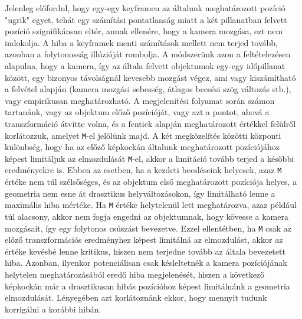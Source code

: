 Jelenleg előfordul, hogy egy-egy keyframen az általunk meghatározott pozíció "ugrik" egyet, tehát egy számítási pontatlanság miatt a két pillanatban felvett pozíció szignifikánsan eltér, annak ellenére, hogy a kamera mozgása, ezt nem indokolja.
A hiba a keyframek menti számítások mellett nem terjed tovább, azonban a folytonosság illúzióját rombolja.
A módszerünk azon a feltételezésen alapulna, hogy a kamera, így az általa felvett objektumok egy-egy időpillanat között, egy bizonyos távolságnál kevesebb mozgást végez, ami vagy kiszámítható a felvétel alapján (kamera mozgási sebesség, átlagos beesési szög változás stb.), vagy empirikusan meghatározható.
A megjelenítési folyamat során számon tartanánk, vagy az objektum előző pozícióját, vagy azt a pontot, ahová a transzformáció átvitte volna, és a fentiek alapján meghatározott értékkel felülről korlátozzuk, amelyet \texttt{M}-el jelölünk majd. 
A két megközelítés közötti központi különbség, hogy ha az előző képkockán általunk meghatározott pozíciójához képest limitáljuk az elmozdulását \texttt{M}-el, akkor a limitáció tovább terjed a későbbi eredményekre is.
Ebben az esetben, ha a kezdeti becsléseink helyesek, azaz \texttt{M} értéke nem túl szélsőséges, és az objektum első meghatározott pozíciója helyes, a geometria nem esne át drasztikus helyváltozásokon, így limitálható lenne a maximális hiba mértéke.
Ha \texttt{M} értéke helytelenül lett meghatározva, azaz például túl alacsony, akkor nem fogja engedni az objektumnak, hogy kövesse a kamera mozgásait, így egy folytonos csúszást bevezetve.
Ezzel ellentétben, ha \texttt{M} csak az előző transzformációs eredményhez képest limitálná az elmozdulást, akkor az értéke kevésbé lenne kritikus, hiszen nem terjedne tovább az általa bevezetett hiba.
Azonban, ilyenkor potenciálisan csak késleltetnék a kamera pozíciójának helytelen meghatározásából eredő hiba megjelenését, hiszen a következő képkockán már a drasztikusan hibás pozícióhoz képest limitálnánk a geometria elmozdulását.
Lényegében azt korlátoznánk ekkor, hogy mennyit tudunk korrigálni a korábbi hibán.
